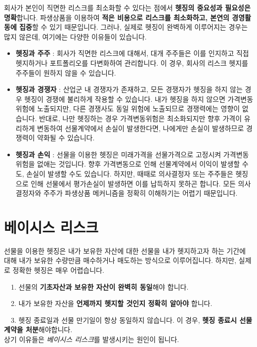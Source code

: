 \documentclass[
  letterpaper,
  DIV=11,
  numbers=noendperiod]{scrreprt}
\begin{document}

회사가 본인이 직면한 리스크를 최소화할 수 있다는 점에서 \textbf{헷징의
중요성과 필요성은 명확}합니다. 파생상품을 이용하여 \textbf{적은 비용으로
리스크를 최소화하고, 본연의 경영활동에 집중}할 수 있기 때문입니다.
그러나, 실제로 헷징이 완벽하게 이루어지는 경우는 많지 않은데, 여기에는
다양한 이유들이 있습니다.

\begin{itemize}
\item
  \textbf{헷징과 주주} : 회사가 직면한 리스크에 대해서, 대개 주주들은
  이를 인지하고 직접 헷지하거나 포트폴리오를 다변화하여 관리합니다. 이
  경우, 회사의 리스크 헷지를 주주들이 원하지 않을 수 있습니다.
\item
  \textbf{헷징과 경쟁자} : 산업군 내 경쟁자가 존재하고, 모든 경쟁자가
  헷징을 하지 않는 경우 헷징이 경쟁에 불리하게 작용할 수 있습니다. 내가
  헷징을 하지 않으면 가격변동위험에 노출되지만, 다른 경쟁사도 동일
  위험에 노출되므로 경쟁력에는 영향이 없습니다. 반대로, 나만 헷징하는
  경우 가격변동위험은 최소화되지만 향후 가격이 유리하게 변동하여
  선물계약에서 손실이 발생한다면, 나에게만 손실이 발생하므로 경쟁력이
  약화될 수 있습니다.
\item
  \textbf{헷징과 손익} : 선물을 이용한 헷징은 미래가격을 선물가격으로
  고정시켜 가격변동위험을 없애는 것입니다. 향후 가격변동으로 인해
  선물계약에서 이익이 발생할 수도, 손실이 발생할 수도 있습니다. 하지만,
  때때로 의사결정자 또는 주주들은 헷징으로 인해 선물에서 평가손실이
  발생하면 이를 납득하지 못하곤 합니다. 모든 의사결정자와 주주가
  파생상품 메커니즘을 정확히 이해하기는 어렵기 때문입니다.
\end{itemize}

\section*{베이시스
리스크}\label{uxbca0uxc774uxc2dcuxc2a4-uxb9acuxc2a4uxd06c}


선물을 이용한 헷징은 내가 보유한 자산에 대한 선물을 내가 헷지하고자 하는
기간에 대해 내가 보유한 수량만큼 매수하거나 매도하는 방식으로
이루어집니다. 하지만, 실제로 정확한 헷징은 매우 어렵습니다.\\
\strut ~~1. 선물의 \textbf{기초자산과 보유한 자산이 완벽히 동일}해야
합니다.\\
\strut ~~2. 내가 보유한 자산을 \textbf{언제까지 헷지할 것인지 정확히
알아야} 합니다.\\
\strut ~~3. 헷징 종료일과 선물 만기일이 항상 동일하지 않습니다. 이 경우,
\textbf{헷징 종료시 선물계약을 처분}해야합니다.\\
상기 이유들은 \emph{베이시스 리스크}를 발생시키는 원인이 됩니다.
\end{document}
